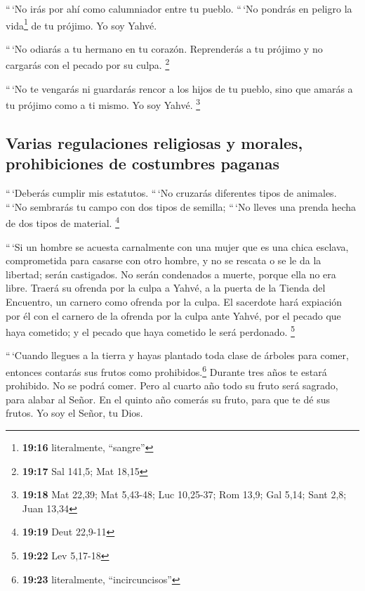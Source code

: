 \begin{paracol}{2}
 ``\,`No irás por ahí como calumniador entre tu pueblo.
``\,`No pondrás en peligro la vida\footnote{\textbf{19:16} literalmente,
  ``sangre''} de tu prójimo. Yo soy Yahvé.

 ``\,`No odiarás a tu hermano en tu corazón. Reprenderás
a tu prójimo y no cargarás con el pecado por su culpa. \footnote{\textbf{19:17}
  Sal 141,5; Mat 18,15}

 ``\,`No te vengarás ni guardarás rencor a los hijos de
tu pueblo, sino que amarás a tu prójimo como a ti mismo. Yo soy Yahvé.
\footnote{\textbf{19:18} Mat 22,39; Mat 5,43-48; Luc 10,25-37; Rom 13,9;
  Gal 5,14; Sant 2,8; Juan 13,34}

\hypertarget{varias-regulaciones-religiosas-y-morales-prohibiciones-de-costumbres-paganas}{%
\subsection{Varias regulaciones religiosas y morales, prohibiciones de
costumbres
paganas}\label{varias-regulaciones-religiosas-y-morales-prohibiciones-de-costumbres-paganas}}

 ``\,`Deberás cumplir mis estatutos. ``\,`No cruzarás
diferentes tipos de animales. ``\,`No sembrarás tu campo con dos tipos
de semilla; ``\,`No lleves una prenda hecha de dos tipos de material.
\footnote{\textbf{19:19} Deut 22,9-11}

 ``\,`Si un hombre se acuesta carnalmente con una mujer
que es una chica esclava, comprometida para casarse con otro hombre, y
no se rescata o se le da la libertad; serán castigados. No serán
condenados a muerte, porque ella no era libre.  Traerá su
ofrenda por la culpa a Yahvé, a la puerta de la Tienda del Encuentro, un
carnero como ofrenda por la culpa.  El sacerdote hará
expiación por él con el carnero de la ofrenda por la culpa ante Yahvé,
por el pecado que haya cometido; y el pecado que haya cometido le será
perdonado. \footnote{\textbf{19:22} Lev 5,17-18}

 ``\,`Cuando llegues a la tierra y hayas plantado toda
clase de árboles para comer, entonces contarás sus frutos como
prohibidos.\footnote{\textbf{19:23} literalmente, ``incircuncisos''}
Durante tres años te estará prohibido. No se podrá comer.
 Pero al cuarto año todo su fruto será sagrado, para
alabar al Señor.  En el quinto año comerás su fruto, para
que te dé sus frutos. Yo soy el Señor, tu Dios.


\end{paracol}
